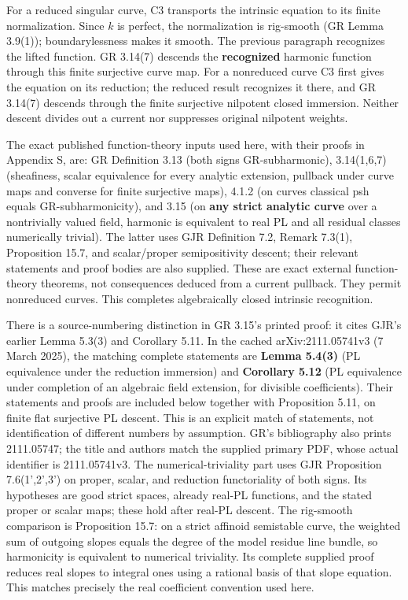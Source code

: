 \documentclass[
  10pt,
]{article}
\begin{document}
For a reduced singular curve, C3 transports the intrinsic equation to
its finite normalization. Since \(k\) is perfect, the normalization is
rig-smooth (GR Lemma 3.9(1)); boundarylessness makes it smooth. The
previous paragraph recognizes the lifted function. GR 3.14(7) descends
the \textbf{recognized} harmonic function through this finite surjective
curve map. For a nonreduced curve C3 first gives the equation on its
reduction; the reduced result recognizes it there, and GR 3.14(7)
descends through the finite surjective nilpotent closed immersion.
Neither descent divides out a current nor suppresses original nilpotent
weights.

The exact published function-theory inputs used here, with their proofs
in Appendix S, are: GR Definition 3.13 (both signs GR-subharmonic),
3.14(1,6,7) (sheafiness, scalar equivalence for every analytic
extension, pullback under curve maps and converse for finite surjective
maps), 4.1.2 (on curves classical psh equals GR-subharmonicity), and
3.15 (on \textbf{any strict analytic curve} over a nontrivially valued
field, harmonic is equivalent to real PL and all residual classes
numerically trivial). The latter uses GJR Definition 7.2, Remark 7.3(1),
Proposition 15.7, and scalar/proper semipositivity descent; their
relevant statements and proof bodies are also supplied. These are exact
external function-theory theorems, not consequences deduced from a
current pullback. They permit nonreduced curves. This completes
algebraically closed intrinsic recognition.

There is a source-numbering distinction in GR 3.15's printed proof: it
cites GJR's earlier Lemma 5.3(3) and Corollary 5.11. In the cached
arXiv:2111.05741v3 (7 March 2025), the matching complete statements are
\textbf{Lemma 5.4(3)} (PL equivalence under the reduction immersion) and
\textbf{Corollary 5.12} (PL equivalence under completion of an algebraic
field extension, for divisible coefficients). Their statements and
proofs are included below together with Proposition 5.11, on finite flat
surjective PL descent. This is an explicit match of statements, not
identification of different numbers by assumption. GR's bibliography
also prints 2111.05747; the title and authors match the supplied primary
PDF, whose actual identifier is 2111.05741v3. The numerical-triviality
part uses GJR Proposition 7.6(1',2',3') on proper, scalar, and reduction
functoriality of both signs. Its hypotheses are good strict spaces,
already real-PL functions, and the stated proper or scalar maps; these
hold after real-PL descent. The rig-smooth comparison is Proposition
15.7: on a strict affinoid semistable curve, the weighted sum of
outgoing slopes equals the degree of the model residue line bundle, so
harmonicity is equivalent to numerical triviality. Its complete supplied
proof reduces real slopes to integral ones using a rational basis of
that slope equation. This matches precisely the real coefficient
convention used here.
\end{document}
